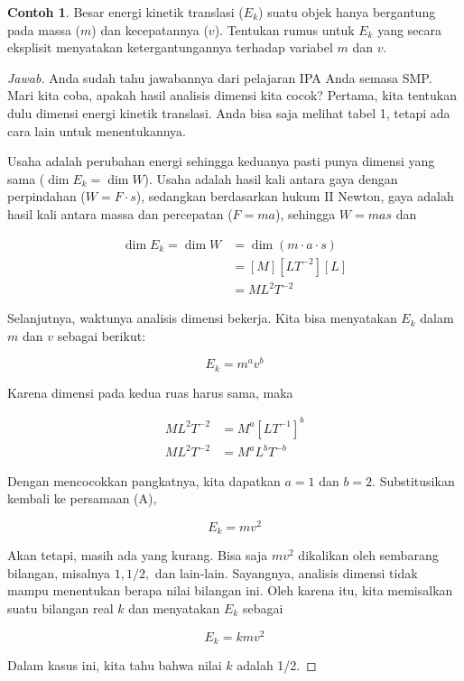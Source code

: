 \documentclass[12pt, a4paper]{article}\usepackage[utf8]{inputenc}
\theoremstyle{plain}
\theoremstyle{plain}
\numberwithin{equation}{section}
\theoremstyle{definition}
\newtheorem{contoh}[teorema]{Contoh}
\begin{document}
	\begin{contoh}
		Besar energi kinetik translasi ($E_k$) suatu objek hanya bergantung pada massa ($m$) dan kecepatannya ($v$). Tentukan rumus untuk $E_k$ yang secara eksplisit menyatakan ketergantungannya terhadap variabel $m$ dan $v$.
	\end{contoh}
	\begin{proof}[Jawab]
		Anda sudah tahu jawabannya dari pelajaran IPA Anda semasa SMP. Mari kita coba, apakah hasil analisis dimensi kita cocok? Pertama, kita tentukan dulu dimensi energi kinetik translasi. Anda bisa saja melihat tabel 1, tetapi ada cara lain untuk menentukannya.
		
		Usaha adalah perubahan energi sehingga keduanya pasti punya dimensi yang sama ($\dim E_k = \dim W$). Usaha adalah hasil kali antara gaya dengan perpindahan ($W = F \cdot s$), sedangkan berdasarkan hukum II Newton, gaya adalah hasil kali antara massa dan percepatan ($F = ma$), sehingga $W = mas$ dan
		
		\vspace{-1em}
		
		\begin{align*}
			\dim E_k = \dim W &= \dim (m \cdot a \cdot s)\\
			&= [M][LT^{-2}][L]\\
			&= ML^{2}T^{-2}
		\end{align*}
		
		Selanjutnya, waktunya analisis dimensi bekerja. Kita bisa menyatakan $E_k$ dalam $m$ dan $v$ sebagai berikut:
		
		\begin{equation*}
			E_k = m^a v^b \tag{A}
		\end{equation*}
		
		Karena dimensi pada kedua ruas harus sama, maka
		
		\begin{align*}
			ML^2T^{-2} &= M^a [LT^{-1}]^b\\
			M L^2 T^{-2} &= M^a L^b T^{-b}
		\end{align*}
		
		Dengan mencocokkan pangkatnya, kita dapatkan $a = 1$ dan $b = 2.$ Substitusikan kembali ke persamaan (A),
		
		\begin{equation*}
			E_k = mv^2
		\end{equation*}
		
		Akan tetapi, masih ada yang kurang. Bisa saja $mv^2$ dikalikan oleh sembarang bilangan, misalnya $1, 1/2,$ dan lain-lain. Sayangnya, analisis dimensi tidak mampu menentukan berapa nilai bilangan ini. Oleh karena itu, kita memisalkan suatu bilangan real $k$ dan menyatakan $E_k$ sebagai
		
		\begin{equation*}
			E_k = kmv^2
		\end{equation*}
		
		Dalam kasus ini, kita tahu bahwa nilai $k$ adalah 1/2.
	\end{proof}
	
\end{document}
